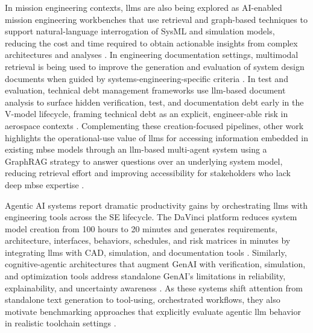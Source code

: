In mission engineering contexts, \acp{llm} are also being explored as AI-enabled mission engineering workbenches that use retrieval and graph-based techniques to support natural-language interrogation of SysML and simulation models, reducing the cost and time required to obtain actionable insights from complex architectures and analyses \cite{Pennock_AI_Enabled_Mission_Engineering_2025}. In engineering documentation settings, multimodal retrieval is being used to improve the generation and evaluation of system design documents when guided by systems-engineering-specific criteria \cite{Guntupalli_Integrating_Generative_AI_Automation_System_Design_Processes_2024}. In test and evaluation, technical debt management frameworks use \ac{llm}-based document analysis to surface hidden verification, test, and documentation debt early in the V-model lifecycle, framing technical debt as an explicit, engineer-able risk in aerospace contexts \cite{Ouzzif_Leveraging_AI_Manage_Technical_Debt_Test_Evaluation_2025}. Complementing these creation-focused pipelines, other work highlights the operational-use value of \acp{llm} for accessing information embedded in existing \ac{mbse} models through an \ac{llm}-based multi-agent system using a GraphRAG strategy to answer questions over an underlying system model, reducing retrieval effort and improving accessibility for stakeholders who lack deep \ac{mbse} expertise \cite{quast_EnablingHumansAI_2026}.

Agentic AI systems report dramatic productivity gains by orchestrating \acp{llm} with engineering tools across the SE lifecycle. The DaVinci platform reduces system model creation from 100 hours to 20 minutes and generates requirements, architecture, interfaces, behaviors, schedules, and risk matrices in minutes by integrating \acp{llm} with CAD, simulation, and documentation tools \cite{Helmerich_Transforming_Systems_Engineering_Agentic_AI_2025}. Similarly, cognitive-agentic architectures that augment GenAI with verification, simulation, and optimization tools address standalone GenAI's limitations in reliability, explainability, and uncertainty awareness \cite{Lee_CastilloEffen_2024_Rapid_Intelligent_Systems_Engineering, Ahmad_2026_Digital_Twin_Driven_AI_Automation_Optimization}. As these systems shift attention from standalone text generation to tool-using, orchestrated workflows, they also motivate benchmarking approaches that explicitly evaluate agentic \ac{llm} behavior in realistic toolchain settings \cite{mohammadi_EvaluationBenchmarkingLLM_2025}.

